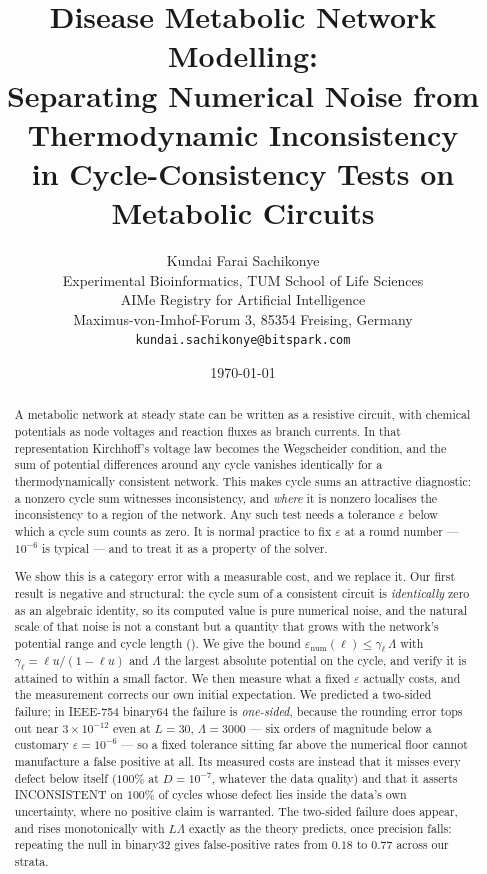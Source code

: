 \documentclass[11pt,twocolumn,a4paper]{article}
\title{\textbf{Disease Metabolic Network Modelling:}\\[4pt]
\large Separating Numerical Noise from Thermodynamic Inconsistency\\
in Cycle-Consistency Tests on Metabolic Circuits}
\author{%
Kundai Farai Sachikonye\\[0.3em]
\normalsize Experimental Bioinformatics, TUM School of Life Sciences\\
\normalsize AIMe Registry for Artificial Intelligence \\
\normalsize Maximus-von-Imhof-Forum 3, 85354 Freising, Germany\\
\normalsize \texttt{kundai.sachikonye@bitspark.com}}
\date{\today}
\theoremstyle{pstyle}
\theoremstyle{definition}
\theoremstyle{remark}
\newcommand{\eps}{\varepsilon}
\newcommand{\epsnum}{\eps_{\mathrm{num}}}
\newcommand{\mach}{u}
\begin{document}
\maketitle

\begin{abstract}
\noindent
A metabolic network at steady state can be written as a resistive
circuit, with chemical potentials as node voltages and reaction fluxes
as branch currents. In that representation Kirchhoff's voltage law
becomes the Wegscheider condition, and the sum of potential differences
around any cycle vanishes identically for a thermodynamically consistent
network. This makes cycle sums an attractive diagnostic: a nonzero cycle
sum witnesses inconsistency, and \emph{where} it is nonzero localises
the inconsistency to a region of the network. Any such test needs a
tolerance $\eps$ below which a cycle sum counts as zero. It is normal
practice to fix $\eps$ at a round number --- $10^{-6}$ is typical --- and
to treat it as a property of the solver.

We show this is a category error with a measurable cost, and we replace
it. Our first result is negative and structural: the cycle sum of a
consistent circuit is \emph{identically} zero as an algebraic identity,
so its computed value is pure numerical noise, and the natural scale of
that noise is not a constant but a quantity that grows with the
network's potential range and cycle length
(). We give the bound
$\epsnum(\ell) \le \gamma_{\ell}\,\Lambda$ with
$\gamma_\ell = \ell \mach/(1-\ell \mach)$ and $\Lambda$ the largest
absolute potential on the cycle, and verify it is attained to within a
small factor. We then measure what a fixed $\eps$ actually costs, and the
measurement corrects our own initial expectation. We predicted a
two-sided failure; in IEEE-754 binary64 the failure is \emph{one-sided},
because the rounding error tops out near $3\times10^{-12}$ even at
$L=30$, $\Lambda=3000$ --- six orders of magnitude below a customary
$\eps=10^{-6}$ --- so a fixed tolerance sitting far above the numerical
floor cannot manufacture a false positive at all. Its measured costs are
instead that it misses every defect below itself ($100\%$ at
$D=10^{-7}$, whatever the data quality) and that it asserts
\textsf{INCONSISTENT} on $100\%$ of cycles whose defect lies inside the
data's own uncertainty, where no positive claim is warranted. The
two-sided failure does appear, and rises monotonically with $L\Lambda$
exactly as the theory predicts, once precision falls: repeating the null
in binary32 gives false-positive rates from $0.18$ to $0.77$ across our
strata.


\end{abstract}
\end{document}
